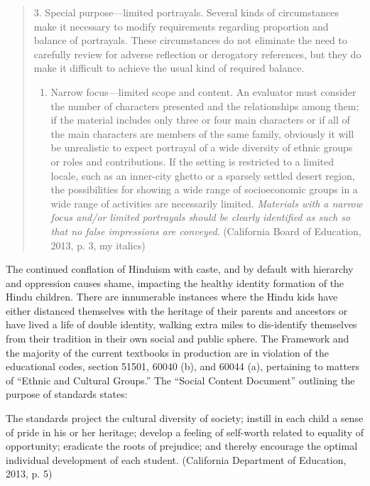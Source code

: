 \begin{quote}
3. Special purpose—limited portrayals. Several kinds of circumstances make it necessary to modify requirements regarding proportion and balance of portrayals. These circumstances do not eliminate the need to carefully review for adverse reflection or derogatory references, but they do make it difficult to achieve the usual kind of required balance.
\begin{enumerate}[{\rm a}]
\item Narrow focus—limited scope and content. An evaluator must consider the number of characters presented and the relationships among them; if the material includes only three or four main characters or if all of the main characters are members of the same family, obviously it will be unrealistic to expect portrayal of a wide diversity of ethnic groups or roles and contributions. If the setting is restricted to a limited locale, such as an inner-city ghetto or a sparsely settled desert region, the possibilities for showing a wide range of socioeconomic groups in a wide range of activities are necessarily limited. \textit{Materials with a narrow focus and/or limited portrayals should be clearly identified as such so that no false impressions are conveyed}. (California Board of Education, 2013, p. 3, my italics) 
\end{enumerate}
\end{quote}

The continued conflation of Hinduism with caste, and by default with hierarchy and oppression causes shame, impacting the healthy identity formation of the Hindu children. There are innumerable instances where the Hindu kids have either distanced themselves with the heritage of their parents and ancestors or have lived a life of double identity, walking extra miles to dis-identify themselves from their tradition in their own social and public sphere. The Framework and the majority of the current textbooks in production are in violation of the educational codes, section 51501, 60040 (b), and 60044 (a), pertaining to matters of “Ethnic and Cultural Groups.” The “Social Content Document” outlining the purpose of standards states: 

The standards project the cultural diversity of society; instill in each child a sense of pride in his or her heritage; develop a feeling of self-worth related to equality of opportunity; eradicate the roots of prejudice; and thereby encourage the optimal individual development of each student. (California Department of Education, 2013, p. 5)

